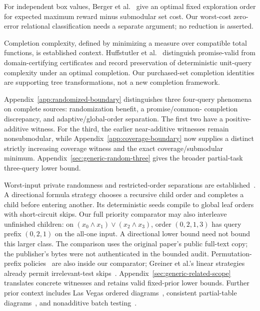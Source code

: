 \documentclass[pdflatex,sn-mathphys-num]{sn-jnl}
\theoremstyle{thmstyleone}
\theoremstyle{thmstylethree}
\theoremstyle{thmstyletwo}
\begin{document}
For independent box values, Berger et al.~\cite{pandora} give an optimal fixed exploration order for expected maximum reward minus submodular set cost. Our worst-cost zero-error relational classification needs a separate argument; no reduction is asserted.

Completion complexity, defined by minimizing a measure over compatible total functions, is established context. Huffstutler et al.~\cite{huffstutler2026completion} distinguish promise-valid from domain-certifying certificates and record preservation of deterministic unit-query complexity under an optimal completion. Our purchased-set completion identities are supporting tree transformations, not a new completion framework.

Appendix~\ref{app:randomized-boundary} distinguishes three four-query
phenomena on complete sources: randomization benefit, a promise/common-
completion discrepancy, and adaptive/global-order separation. The first
two have a positive-additive witness. For the third, the earlier
near-additive witnesses remain nonsubmodular, while
Appendix~\ref{app:coverage-boundary} now supplies a distinct strictly
increasing coverage witness and the exact coverage/submodular minimum.
Appendix~\ref{sec:generic-random-three} gives the broader partial-task
three-query lower bound.

Worst-input private randomness and restricted-order separations are established~\cite{amano2011directional}. A directional formula strategy chooses a recursive child order and completes a child before entering another. Its deterministic seeds compile to global leaf orders with short-circuit skips. Our full priority comparator may also interleave unfinished children: on $(x_0\wedge x_1)\vee(x_2\wedge x_3)$, order $(0,2,1,3)$ has query prefix $(0,2,1)$ on the all-one input. A directional lower bound need not bound this larger class. The comparison uses the original paper's public full-text copy; the publisher's bytes were not authenticated in the bounded audit. Permutation-prefix policies~\cite{hellerstein2022adaptivity} are also inside our comparator; Greiner et al.'s linear strategies already permit irrelevant-test skips~\cite{greiner}. Appendix~\ref{sec:generic-related-scope} translates concrete witnesses and retains valid fixed-prior lower bounds. Further prior context includes Las Vegas ordered diagrams~\cite{karpinski1999}, consistent partial-table diagrams~\cite{kristensen2006}, and nonadditive batch testing~\cite{harris2025}.
\end{document}
